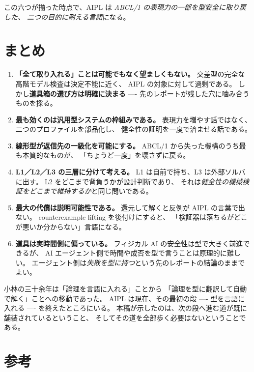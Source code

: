 \documentclass[11pt,a4paper]{ltjsarticle}
\theoremstyle{remark}
\begin{document}
この六つが揃った時点で、AIPL は
\emph{ABCL/1 の表現力の一部を型安全に取り戻した、
二つの目的に耐える言語}になる。

\section{まとめ}

\begin{enumerate}
\item \textbf{「全て取り入れる」ことは可能でもなく望ましくもない。}
  交差型の完全な高階モデル検査は決定不能に近く、
  AIPL の対象に対して過剰である。
  しかし\textbf{道具箱の選び方は明確に決まる} ----
  先のレポートが残した穴に噛み合うものを採る。

\item \textbf{最も効くのは汎用型システムの枠組みである。}
  表現力を増やす話ではなく、二つのプロファイルを部品化し、
  健全性の証明を一度で済ませる話である。

\item \textbf{線形型が返信先の一級化を可能にする。}
  ABCL/1 から失った機構のうち最も本質的なものが、
  「ちょうど一度」を壊さずに戻る。

\item \textbf{L1／L2／L3 の三層に分けて考える。}
  L1 は自前で持ち、L3 は外部ソルバに出す。
  L2 をどこまで背負うかが設計判断であり、
  それは\emph{健全性の機械検証をどこまで維持するか}と同じ問いである。

\item \textbf{最大の代償は説明可能性である。}
  還元して解くと反例が AIPL の言葉で出ない。
  counterexample lifting を後付けにすると、
  「検証器は落ちるがどこが悪いか分からない」言語になる。

\item \textbf{道具は実時間側に偏っている。}
  フィジカル AI の安全性は型で大きく前進できるが、
  AI エージェント側で時間や成否を型で言うことは原理的に難しい。
  エージェント側は\emph{失敗を型に持つ}という先のレポートの結論のままでよい。
\end{enumerate}

小林の三十余年は「論理を言語に入れる」ことから
「論理を型に翻訳して自動で解く」ことへの移動であった。
AIPL は現在、その最初の段 ---- 型を言語に入れる ---- を終えたところにいる。
本稿が示したのは、次の段へ進む道が既に舗装されているということ、
そしてその道を全部歩く必要はないということである。

\section*{参考}
\end{document}
